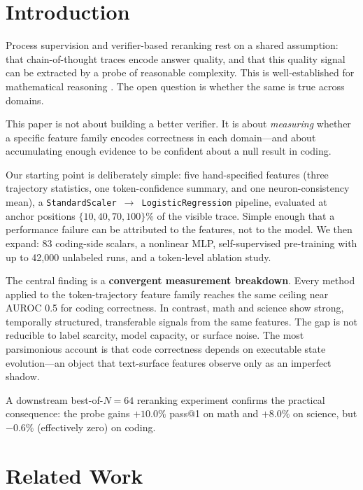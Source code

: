 \documentclass[10pt,twocolumn]{article}
\begin{document}
\section{Introduction}

Process supervision and verifier-based reranking rest on a shared assumption: that chain-of-thought traces encode answer quality, and that this quality signal can be extracted by a probe of reasonable complexity. This is well-established for mathematical reasoning \citep{cobbe2021training,lightman2023verify,wang2024mathshepherd}. The open question is whether the same is true across domains.

This paper is not about building a better verifier. It is about \emph{measuring} whether a specific feature family encodes correctness in each domain—and about accumulating enough evidence to be confident about a null result in coding.

Our starting point is deliberately simple: five hand-specified features (three trajectory statistics, one token-confidence summary, and one neuron-consistency mean), a \texttt{StandardScaler $\to$ LogisticRegression} pipeline, evaluated at anchor positions $\{10, 40, 70, 100\}$\% of the visible trace. Simple enough that a performance failure can be attributed to the features, not to the model. We then expand: 83 coding-side scalars, a nonlinear MLP, self-supervised pre-training with up to 42,000 unlabeled runs, and a token-level ablation study.

The central finding is a \textbf{convergent measurement breakdown}. Every method applied to the token-trajectory feature family reaches the same ceiling near AUROC 0.5 for coding correctness. In contrast, math and science show strong, temporally structured, transferable signals from the same features. The gap is not reducible to label scarcity, model capacity, or surface noise. The most parsimonious account is that code correctness depends on executable state evolution—an object that text-surface features observe only as an imperfect shadow.

A downstream best-of-$N=64$ reranking experiment confirms the practical consequence: the probe gains $+10.0\%$ pass@1 on math and $+8.0\%$ on science, but $-0.6\%$ (effectively zero) on coding.

\section{Related Work}
\end{document}

